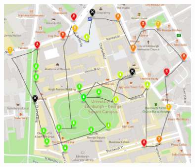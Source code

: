 \documentclass{article}
\begin{document}
\begin{center}
\includegraphics[width=0.75\textwidth]{05-05-2020}
\end{center}




 

\end{document}
